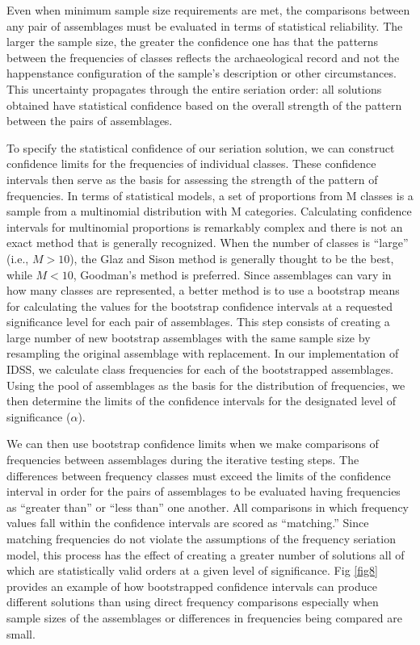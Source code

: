 \documentclass[10pt,letterpaper]{article}
\begin{document}
Even when minimum sample size requirements are met, the comparisons between any pair of assemblages must be evaluated in terms of statistical reliability. The larger the sample size, the greater the confidence one has that the patterns between the frequencies of classes reflects the archaeological record and not the happenstance configuration of the sample’s description or other circumstances. This uncertainty propagates through the entire seriation order: all solutions obtained have statistical confidence based on the overall strength of the pattern between the pairs of assemblages. 

To specify the statistical confidence of our seriation solution, we can construct confidence limits for the frequencies of individual classes. These confidence intervals then serve as the basis for assessing the strength of the pattern of frequencies. In terms of statistical models, a set of proportions from M classes is a sample from a multinomial distribution with M categories. Calculating confidence intervals for multinomial proportions is remarkably complex and there is not an exact method that is generally recognized. When the number of classes is “large” (i.e., $M > 10$), the Glaz and Sison \cite{Glaz1999} method is generally thought to be the best, while $M < 10$, Goodman's method \cite{Goodman1965} is preferred. Since assemblages can vary in how many classes are represented, a better method is to use a bootstrap means for calculating the values for the bootstrap confidence intervals at a requested significance level for each pair of assemblages. This step consists of creating a large number of new bootstrap assemblages with the same sample size by resampling the original assemblage with replacement. In our implementation of IDSS, we calculate class frequencies for each of the bootstrapped assemblages. Using the pool of assemblages as the basis for the distribution of frequencies, we then determine the limits of the confidence intervals for the designated level of significance ($\alpha$).

We can then use bootstrap confidence limits when we make comparisons of frequencies between assemblages during the iterative testing steps. The differences between frequency classes must exceed the limits of the confidence interval in order for the pairs of assemblages to be evaluated having frequencies as “greater than” or “less than” one another. All comparisons in which frequency values fall within the confidence intervals are scored as “matching.” Since matching frequencies do not violate the assumptions of the frequency seriation model, this process has the effect of creating a greater number of solutions all of which are statistically valid orders at a given level of significance. Fig \ref{fig8} provides an example of how bootstrapped confidence intervals can produce different solutions than using direct frequency comparisons especially when sample sizes of the assemblages or differences in frequencies being compared are small.
\end{document}
